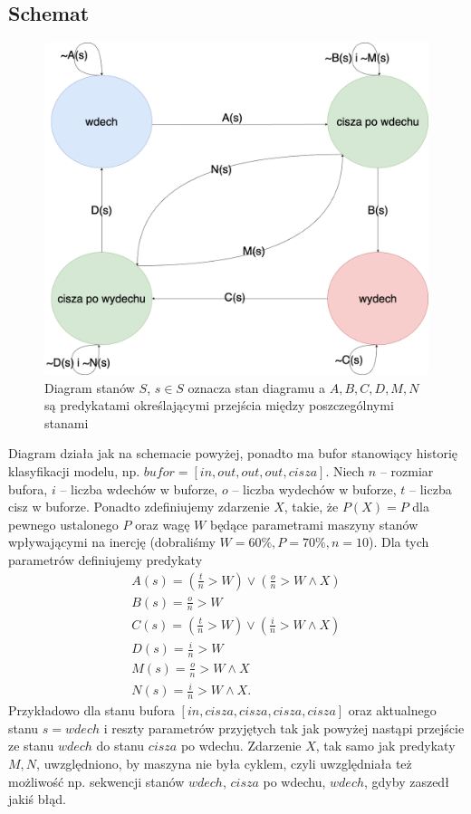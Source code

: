 \documentclass[polish]{article}
\begin{document}
\subsection{Schemat}
\begin{figure}[H]
	\centering
	\includegraphics[width=13cm]{dstanow}
	\caption{Diagram stanów $S$, $s \in S$ oznacza stan diagramu a $A, B, C, D, M, N$ są predykatami określającymi przejścia między poszczególnymi stanami}
\end{figure}
Diagram działa jak na schemacie powyżej, ponadto ma bufor stanowiący historię klasyfikacji modelu, np. $bufor = [in, out, out, out, cisza]$. Niech $n$ -- rozmiar bufora,
$i$ -- liczba wdechów w buforze, $o$ -- liczba wydechów w buforze, $t$ -- liczba cisz w buforze. Ponadto zdefiniujemy zdarzenie $X$, takie, że $P(X) = P$ dla pewnego ustalonego $P$
oraz wagę $W$ będące parametrami maszyny stanów wpływającymi na inercję (dobraliśmy $W = 60\%, P=70\%, n = 10$). Dla tych parametrów definiujemy predykaty
\begin{gather*}
	A(s) = (\frac{t}{n} > W) \lor (\frac{o}{n} > W \land X) \\
	B(s) = \frac{o}{n} > W \\
	C(s) =  (\frac{t}{n} > W) \lor (\frac{i}{n} > W \land X) \\
	D(s) = \frac{i}{n} > W \\
	M(s) = \frac{o}{n} > W \land X \\
	N(s) = \frac{i}{n} > W \land X.
\end{gather*}
Przykładowo dla stanu bufora $[in,cisza, cisza, cisza, cisza]$ oraz aktualnego stanu $s = wdech$ i reszty parametrów przyjętych tak jak powyżej nastąpi przejście
ze stanu $wdech$ do stanu $cisza$ po wdechu. Zdarzenie $X$, tak samo jak predykaty $M, N$, uwzględniono, by maszyna nie była cyklem, czyli uwzględniała też możliwość np. sekwencji stanów
$wdech$, $cisza$ po wdechu, $wdech$, gdyby zaszedł jakiś błąd.
\end{document}
